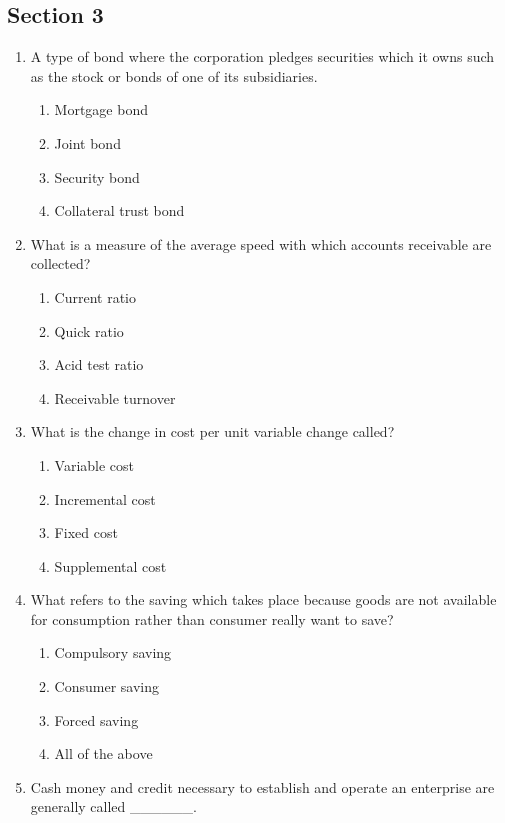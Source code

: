 \documentclass[11pt,a4paper]{article}
\begin{document}
\subsection*{Section 3}
\begin{enumerate}
\item{A type of bond where the corporation pledges securities which it owns such as the stock or bonds of one of its subsidiaries.}
\begin{enumerate}[label=\Alph*.]
\item{Mortgage bond}
\item{Joint bond}
\item{Security bond}
\item{Collateral trust bond}
\end{enumerate}
\item{What is a measure of the average speed with which accounts receivable are collected?}
\begin{enumerate}[label=\Alph*.]
\item{Current ratio}
\item{Quick ratio}
\item{Acid test ratio}
\item{Receivable turnover}
\end{enumerate}
\item{What is the change in cost per unit variable change called?}
\begin{enumerate}[label=\Alph*.]
\item{Variable cost}
\item{Incremental cost}
\item{Fixed cost}
\item{Supplemental cost}
\end{enumerate}
\item{What refers to the saving which takes place because goods are not available for consumption rather than consumer really want to save?}
\begin{enumerate}[label=\Alph*.]
\item{Compulsory saving}
\item{Consumer saving}
\item{Forced saving}
\item{All of the above}
\end{enumerate}
\item{Cash money and credit necessary to establish and operate an enterprise are generally called \_\_\_\_\_\_.}
\\\begin{enumerate*}[itemjoin=\qquad, label=\Alph*.]

\end{enumerate*}
\end{enumerate}
\end{document}
